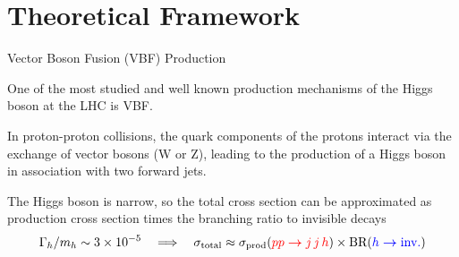 \documentclass{../../bredelebeamer}
\begin{document}
\section{Theoretical Framework}
\begin{frame}{Vector Boson Fusion (VBF) Production}

    One of the most studied and well known production mechanisms of the Higgs boson at the LHC is VBF. 
    
    \vfill 

    In proton-proton collisions, the quark components of the protons interact via the exchange of vector bosons (W or Z), leading to the production of a Higgs boson in association with two forward jets.

    \vfill 

    The Higgs boson is narrow, so the total cross section can be approximated as production cross section times the branching ratio to invisible decays
    \begin{equation*}
            \Gamma_h/m_h \sim 3 \times 10^{-5}
            \quad\Longrightarrow\quad
            \sigma_{\text{total}} \approx \sigma_{\text{prod}} (\textcolor{red}{pp\boldsymbol{\to}j\,j\, h})  \times \text{BR}(\textcolor{blue}{h \boldsymbol{\to} \text{inv.}})
    \end{equation*}


\end{frame}
\end{document}
